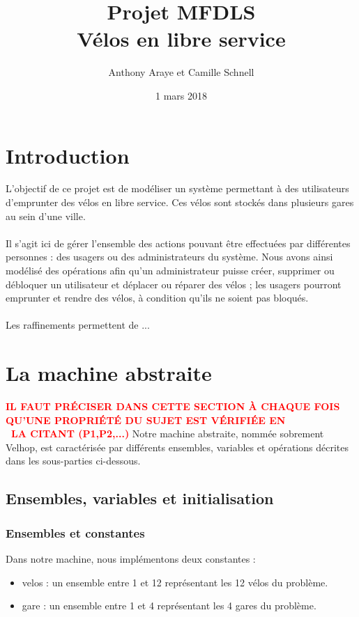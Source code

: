 \documentclass[12pt]{article}
\title{Projet MFDLS \\ Vélos en libre service}
\author{Anthony Araye et Camille Schnell}
\date{1 mars 2018}
\begin{document}
\maketitle
\newpage
\renewcommand{\contentsname}{Sommaire}
\tableofcontents
\newpage
\section{Introduction}
L'objectif de ce projet est de modéliser un système permettant à des utilisateurs d'emprunter des vélos en libre service. Ces vélos sont stockés dans plusieurs gares au sein d'une ville. \\ \\
Il s'agit ici de gérer l'ensemble des actions pouvant être effectuées par différentes personnes : des usagers ou des administrateurs du système. Nous avons ainsi modélisé des opérations afin qu'un administrateur puisse créer, supprimer ou débloquer un utilisateur et déplacer ou réparer des vélos ; les usagers pourront emprunter et rendre des vélos, à condition qu'ils ne soient pas bloqués. \\ \\
Les raffinements permettent de ...
\newpage
\section{La machine abstraite}
\textcolor{red}{\textbf{IL FAUT PRÉCISER DANS CETTE SECTION À CHAQUE FOIS QU'UNE PROPRIÉTÉ DU SUJET EST VÉRIFIÉE EN \\ LA CITANT (P1,P2,...)}}
Notre machine abstraite, nommée sobrement Velhop, est caractérisée par différents ensembles, variables et opérations décrites dans les sous-parties ci-dessous.
\subsection{Ensembles, variables et initialisation}
\subsubsection{Ensembles et constantes}
Dans notre machine, nous implémentons deux constantes :
\begin{itemize}
  \item velos : un ensemble entre 1 et 12 représentant les 12 vélos du problème.
  \item gare : un ensemble entre 1 et 4 représentant les 4 gares du problème.
\end{itemize}
\end{document}
